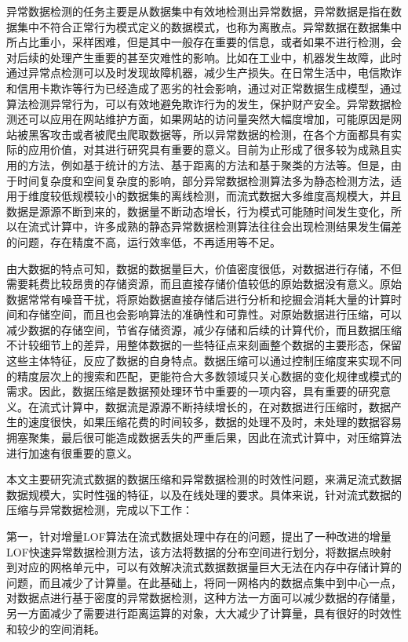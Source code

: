 异常数据检测的任务主要是从数据集中有效地检测出异常数据，异常数据是指在数据集中不符合正常行为模式定义的数据模式，也称为离散点。异常数据在数据集中所占比重小，采样困难，但是其中一般存在重要的信息，或者如果不进行检测，会对后续的处理产生重要的甚至灾难性的影响。比如在工业中，机器发生故障，此时通过异常点检测可以及时发现故障机器，减少生产损失。在日常生活中，电信欺诈和信用卡欺诈等行为已经造成了恶劣的社会影响，通过对正常数据生成模型，通过算法检测异常行为，可以有效地避免欺诈行为的发生，保护财产安全。异常数据检测还可以应用在网站维护方面，如果网站的访问量突然大幅度增加，可能原因是网站被黑客攻击或者被爬虫爬取数据等，所以异常数据的检测，在各个方面都具有实际的应用价值，对其进行研究具有重要的意义。目前为止形成了很多较为成熟且实用的方法，例如基于统计的方法、基于距离的方法和基于聚类的方法等。但是，由于时间复杂度和空间复杂度的影响，部分异常数据检测算法多为静态检测方法，适用于维度较低规模较小的数据集的离线检测，而流式数据大多维度高规模大，并且数据是源源不断到来的，数据量不断动态增长，行为模式可能随时间发生变化，所以在流式计算中，许多成熟的静态异常数据检测算法往往会出现检测结果发生偏差的问题，存在精度不高，运行效率低，不再适用等不足。

由大数据的特点可知，数据的数据量巨大，价值密度很低，对数据进行存储，不但需要耗费比较昂贵的存储资源，而且直接存储价值较低的原始数据没有意义。原始数据常常有噪音干扰，将原始数据直接存储后进行分析和挖掘会消耗大量的计算时间和存储空间，而且也会影响算法的准确性和可靠性。对原始数据进行压缩，可以减少数据的存储空间，节省存储资源，减少存储和后续的计算代价，而且数据压缩不计较细节上的差异，用整体数据的一些特征点来刻画整个数据的主要形态，保留这些主体特征，反应了数据的自身特点。数据压缩可以通过控制压缩度来实现不同的精度层次上的搜索和匹配，更能符合大多数领域只关心数据的变化规律或模式的需求。因此，数据压缩是数据预处理环节中重要的一项内容，具有重要的研究意义。在流式计算中，数据流是源源不断持续增长的，在对数据进行压缩时，数据产生的速度很快，如果压缩花费的时间较多，数据的处理不及时，未处理的数据容易拥塞聚集，最后很可能造成数据丢失的严重后果，因此在流式计算中，对压缩算法进行加速有很重要的意义。

本文主要研究流式数据的数据压缩和异常数据检测的时效性问题，来满足流式数据数据规模大，实时性强的特征，以及在线处理的要求。具体来说，针对流式数据的压缩与异常数据检测，完成以下工作：

第一，针对增量LOF算法在流式数据处理中存在的问题，提出了一种改进的增量LOF快速异常数据检测方法，该方法将数据的分布空间进行划分，将数据点映射到对应的网格单元中，可以有效解决流式数据数据量巨大无法在内存中存储计算的问题，而且减少了计算量。在此基础上，将同一网格内的数据点集中到中心一点，对数据点进行基于密度的异常数据检测，这种方法一方面可以减少数据的存储量，另一方面减少了需要进行距离运算的对象，大大减少了计算量，具有很好的时效性和较少的空间消耗。

